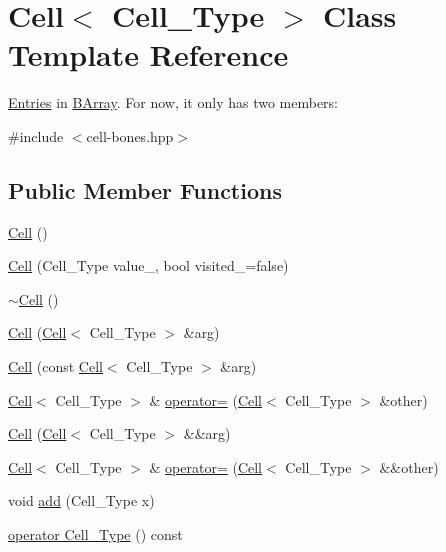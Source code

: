 \hypertarget{class_cell}{}\section{Cell$<$ Cell\+\_\+\+Type $>$ Class Template Reference}
\label{class_cell}


\hyperlink{class_entries}{Entries} in \hyperlink{class_b_array}{B\+Array}. For now, it only has two members\+:  




{\ttfamily \#include $<$cell-\/bones.\+hpp$>$}

\subsection*{Public Member Functions}
\begin{DoxyCompactItemize}
\item 
\hyperlink{class_cell_a402912c21a4c87659c0576a4bfa3c48f}{Cell} ()
\item 
\hyperlink{class_cell_a6592b5fcfc80001c8de64a2e722ca715}{Cell} (Cell\+\_\+\+Type value\+\_\+, bool visited\+\_\+=false)
\item 
\hyperlink{class_cell_a12667d768c7eab9e295b3476a5d60c0e}{$\sim$\+Cell} ()
\item 
\hyperlink{class_cell_acaa165b5c26774c29a7628eda30a7817}{Cell} (\hyperlink{class_cell}{Cell}$<$ Cell\+\_\+\+Type $>$ \&arg)
\item 
\hyperlink{class_cell_a667a3060f565f033a62038500e81342d}{Cell} (const \hyperlink{class_cell}{Cell}$<$ Cell\+\_\+\+Type $>$ \&arg)
\item 
\hyperlink{class_cell}{Cell}$<$ Cell\+\_\+\+Type $>$ \& \hyperlink{class_cell_a6cfdc588dba9ca10a11693d644ac0c60}{operator=} (\hyperlink{class_cell}{Cell}$<$ Cell\+\_\+\+Type $>$ \&other)
\item 
\hyperlink{class_cell_a5271bb77921af0a093658cd05fe0738f}{Cell} (\hyperlink{class_cell}{Cell}$<$ Cell\+\_\+\+Type $>$ \&\&arg)
\item 
\hyperlink{class_cell}{Cell}$<$ Cell\+\_\+\+Type $>$ \& \hyperlink{class_cell_a775ee69aabe8581d9fb2a3729d49a5df}{operator=} (\hyperlink{class_cell}{Cell}$<$ Cell\+\_\+\+Type $>$ \&\&other)
\item 
void \hyperlink{class_cell_a3d063afd2a8743623d0e524debbd55e9}{add} (Cell\+\_\+\+Type x)
\item 
\hyperlink{class_cell_abe9b289bc80d4f5d0717ba9e69197c0b}{operator Cell\+\_\+\+Type} () const
\item 

\end{DoxyCompactItemize}
